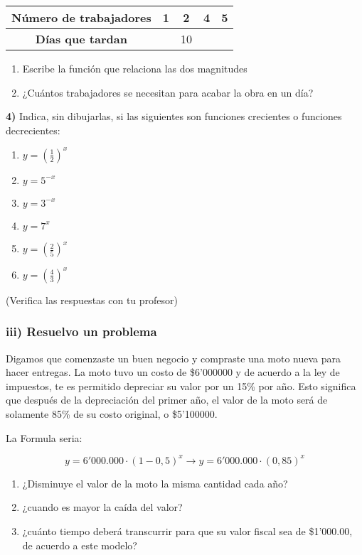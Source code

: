 \documentclass[12pt,a4paper]{article}
\begin{document}
\begin{center}
\begin{tabular}{|c|c|c|c|c|}
\hline
\textbf{Número de trabajadores} & 1 & 2 & 4 & 5 \\
\hline
\textbf{Días que tardan} & & 10 & & \\
\hline
\end{tabular}
\end{center}

\begin{enumerate}[label=\alph*.]
\item Escribe la función que relaciona las dos magnitudes
\item ¿Cuántos trabajadores se necesitan para acabar la obra en un día?
\end{enumerate}

\textbf{4)} Indica, sin dibujarlas, si las siguientes son funciones crecientes o funciones decrecientes:

\begin{enumerate}[label=\alph*.]
\item $y = \left(\frac{1}{2}\right)^x$
\item $y = 5^{-x}$
\item $y = 3^{-x}$
\item $y = 7^x$
\item $y = \left(\frac{2}{5}\right)^x$
\item $y = \left(\frac{4}{3}\right)^x$
\end{enumerate}

(Verifica las respuestas con tu profesor)

\subsubsection*{iii) Resuelvo un problema}

Digamos que comenzaste un buen negocio y compraste una moto nueva para hacer entregas. La moto tuvo un costo de \$6'000000 y de acuerdo a la ley de impuestos, te es permitido depreciar su valor por un 15\% por año. Esto significa que después de la depreciación del primer año, el valor de la moto será de solamente 85\% de su costo original, o \$5'100000.

La Formula seria:

$$y = 6'000.000 \cdot (1 - 0,5)^x \longrightarrow y = 6'000.000 \cdot (0,85)^x$$

\begin{enumerate}[label=\alph*.]
\item ¿Disminuye el valor de la moto la misma cantidad cada año?
\item ¿cuando es mayor la caída del valor?
\item ¿cuánto tiempo deberá transcurrir para que su valor fiscal sea de \$1'000.00, de acuerdo a este modelo?
\end{enumerate}

\end{document}
